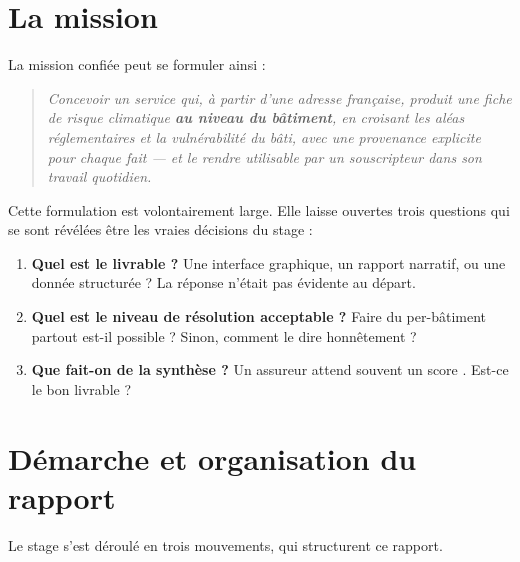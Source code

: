 \section{La mission}

La mission confiée peut se formuler ainsi :

\begin{quote}
\itshape
Concevoir un service qui, à partir d'une adresse française, produit une fiche
de risque climatique \textbf{au niveau du bâtiment}, en croisant les aléas
réglementaires et la vulnérabilité du bâti, avec une provenance explicite pour
chaque fait — et le rendre utilisable par un souscripteur dans son travail
quotidien.
\end{quote}

Cette formulation est volontairement large. Elle laisse ouvertes trois
questions qui se sont révélées être les vraies décisions du stage :

\begin{enumerate}[leftmargin=1.6em]
  \item \textbf{Quel est le livrable ?} Une interface graphique, un rapport
        narratif, ou une donnée structurée ? La réponse n'était pas évidente
        au départ.
  \item \textbf{Quel est le niveau de résolution acceptable ?} Faire du
        per-bâtiment partout est-il possible ? Sinon, comment le dire
        honnêtement ?
  \item \textbf{Que fait-on de la synthèse ?} Un assureur attend souvent un
        \og score \fg. Est-ce le bon livrable ?
\end{enumerate}

\section{Démarche et organisation du rapport}

Le stage s'est déroulé en trois mouvements, qui structurent ce rapport.

